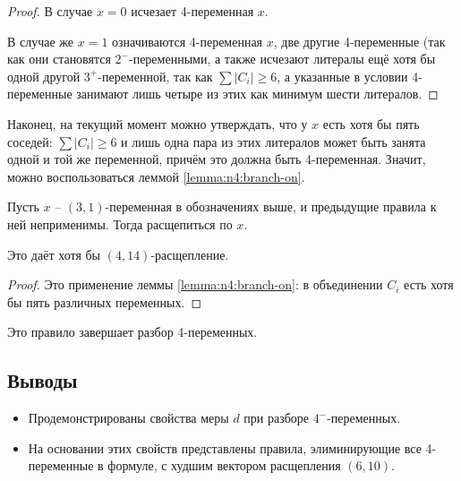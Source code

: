 \begin{proof}
 В случае $x = 0$ исчезает 4-переменная $x$.

 В случае же $x = 1$ означиваются 4-переменная $x$, две другие 4-переменные (так как они становятся $2^-$-переменными, а также исчезают литералы ещё хотя бы одной другой $3^+$-переменной, так как $\sum |C_i| \geq 6$, а указанные в условии 4-переменные занимают лишь четыре из этих как минимум шести литералов.
\end{proof}

Наконец, на текущий момент можно утверждать, что у $x$ есть хотя бы пять соседей: $\sum |C_i| \geq 6$ и лишь одна пара из этих литералов может быть занята одной и той же переменной, причём это должна быть 4-переменная.
Значит, можно воспользоваться леммой \ref{lemma:n4:branch-on}.

\begin{brule}
 Пусть $x$ -- $(3,1)$-переменная в обозначениях выше, и предыдущие правила к ней неприменимы.
 Тогда расщепиться по $x$.

 Это даёт хотя бы $(4,14)$-расщепление.
 \label{brule:n4:31:final}
\end{brule}

\begin{proof}
 Это применение леммы \ref{lemma:n4:branch-on}: в объединении $C_i$ есть хотя бы пять различных переменных.
\end{proof}

Это правило завершает разбор 4-переменных.

\subsection{Выводы}
\label{subsec:n4:summary}

\begin{itemize}
 \item Продемонстрированы свойства меры $d$ при разборе $4^-$-переменных.
 \item На основании этих свойств представлены правила, элиминирующие все 4-переменные в формуле, с худшим вектором расщепления $(6,10)$.
\end{itemize}

